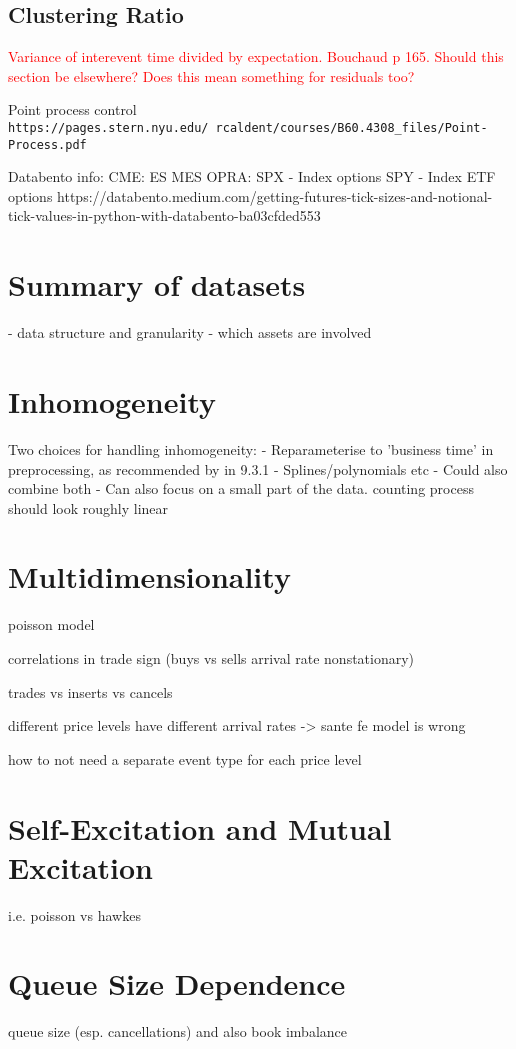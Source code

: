 \documentclass[honours,12pt]{unswthesis}
\numberwithin{equation}{section}
\begin{document}
\subsection{Clustering Ratio}
\textcolor{red}{Variance of interevent time divided by expectation. Bouchaud p 165. Should this section be elsewhere? Does this mean something for residuals too?}

Point process control \texttt{https://pages.stern.nyu.edu/~rcaldent/courses/B60.4308_files/Point-Process.pdf}


Databento info:
CME:
ES
MES
OPRA:
SPX - Index options
SPY - Index ETF options
https://databento.medium.com/getting-futures-tick-sizes-and-notional-tick-values-in-python-with-databento-ba03cfded553
\section{Summary of datasets}
- data structure and granularity
- which assets are involved

\section{Inhomogeneity}
Two choices for handling inhomogeneity:
- Reparameterise to 'business time' in preprocessing, as recommended by \cite{BouchaudEtAl} in 9.3.1
- Splines/polynomials etc
- Could also combine both
- Can also focus on a small part of the data. counting process should look roughly linear

\section{Multidimensionality}
poisson model

correlations in trade sign (buys vs sells arrival rate nonstationary)

trades vs inserts vs cancels

different price levels have different arrival rates -> sante fe model is wrong

how to not need a separate event type for each price level

\section{Self-Excitation and Mutual Excitation}
i.e. poisson vs hawkes

\section{Queue Size Dependence}
queue size (esp. cancellations) and also book imbalance
\end{document}
